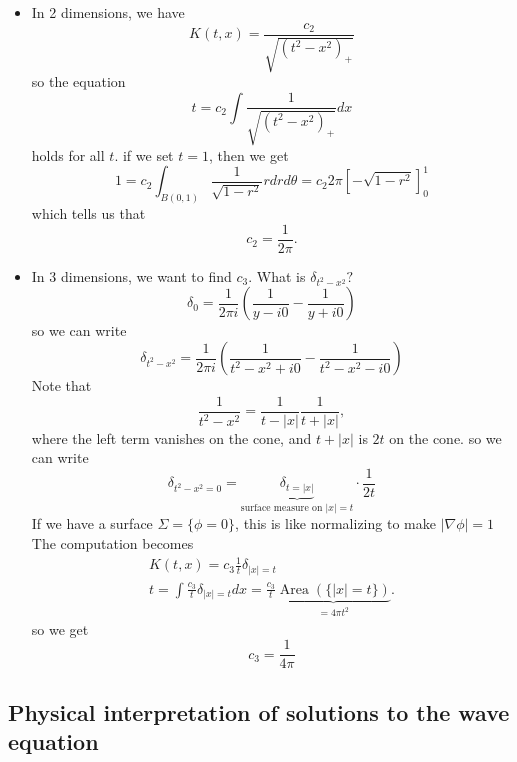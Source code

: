 \begin{itemize}
    \item In 2 dimensions, we have
    $$
    K(t, x)=\frac{c_{2}}{\sqrt{\left(t^{2}-x^{2}\right)_{+}}}
    $$
    so the equation
    $$
    t=c_{2} \int \frac{1}{\sqrt{\left(t^{2}-x^{2}\right)_{+}}} d x
    $$
    holds for all $t$. if we set $t=1$, then we get
    $$
    1=c_{2} \int_{B(0,1)} \frac{1}{\sqrt{1-r^{2}}} r d r d \theta=c_{2} 2 \pi\left[-\sqrt{1-r^{2}}\right]_{0}^{1}
    $$
    which tells us that
    $$
    c_{2}=\frac{1}{2 \pi} .
    $$

    \item In 3 dimensions, we want to find $c_{3}$. What is $\delta_{t^{2}-x^{2}} ?$
    $$
    \delta_{0}=\frac{1}{2 \pi i}\left(\frac{1}{y-i 0}-\frac{1}{y+i 0}\right)
    $$
    so we can write
    $$
    \delta_{t^{2}-x^{2}}=\frac{1}{2 \pi i}\left(\frac{1}{t^{2}-x^{2}+i 0}-\frac{1}{t^{2}-x^{2}-i 0}\right)
    $$
    Note that
    $$
    \frac{1}{t^{2}-x^{2}}= \frac{1}{t-|x|} \frac{1}{t+|x|},
    $$
    where the left term vanishes on the cone, and $t+|x|$ is $2 t$ on the cone. so we can write
    $$
    \delta_{t^{2}-x^{2}=0}=\underbrace{\delta_{t=|x|}}_{\text {surface measure on }|x|=t} \cdot \frac{1}{2 t}
    $$
    If we have a surface $\Sigma=\{\phi=0\}$, this is like normalizing to make $|\nabla \phi|=1$
    The computation becomes
    $$
    \begin{gathered}
    K(t, x)=c_{3} \frac{1}{t} \delta_{|x|=t} \\
    t=\int \frac{c_{3}}{t} \delta_{|x|=t} d x=\frac{c_{3}}{t} \underbrace{\operatorname{Area}(\{|x|=t\})}_{=4 \pi t^{2}} .
    \end{gathered}
    $$
    so we get
    $$
    c_{3}=\frac{1}{4 \pi}
    $$
\end{itemize}

\subsection{Physical interpretation of solutions to the wave equation}

